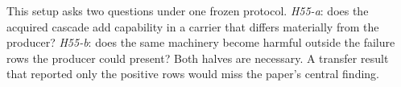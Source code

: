 This setup asks two questions under one frozen protocol. \emph{H55-a}: does the acquired cascade add capability in a carrier that differs materially from the producer? \emph{H55-b}: does the same machinery become harmful outside the failure rows the producer could present? Both halves are necessary. A transfer result that reported only the positive rows would miss the paper's central finding.

